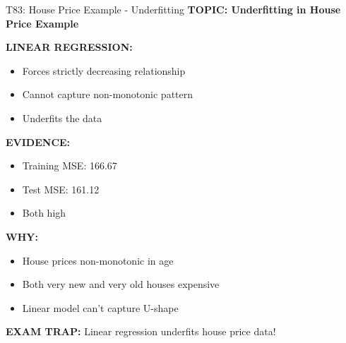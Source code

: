 \documentclass[8pt]{beamer}
\begin{document}
	\begin{frame}{T83: House Price Example - Underfitting}
		\fontsize{6.5}{7.5}\selectfont
		\textbf{TOPIC: Underfitting in House Price Example}
		
		\vspace{0.1cm}
		\textbf{LINEAR REGRESSION:}
		\begin{itemize}
			\item Forces strictly decreasing relationship
			\item Cannot capture non-monotonic pattern
			\item Underfits the data
		\end{itemize}
		
		\vspace{0.1cm}
		\textbf{EVIDENCE:}
		\begin{itemize}
			\item Training MSE: 166.67
			\item Test MSE: 161.12
			\item Both high
		\end{itemize}
		
		\vspace{0.1cm}
		\textbf{WHY:}
		\begin{itemize}
			\item House prices non-monotonic in age
			\item Both very new and very old houses expensive
			\item Linear model can't capture U-shape
		\end{itemize}
		
		\textcolor{myred}{\textbf{EXAM TRAP:}} Linear regression \textcolor{myblue}{underfits} house price data!
	\end{frame}
	
\end{document}
